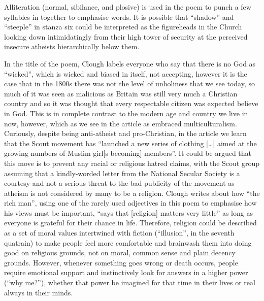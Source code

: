 \documentclass[12pt,a4paper]{article}
\begin{document}
	Alliteration (normal, sibilance, and plosive) is used in the poem to punch a few syllables in together to emphasise words.  It is possible that ``shadow'' and ``steeple'' in stanza six could be interpreted as the figureheads in the Church looking down intimidatingly from their high tower of security at the perceived insecure atheists hierarchically below them.
	
	In the title of the poem, Clough labels everyone who say that there is no God as ``wicked'', which is wicked and biased in itself, not accepting, however it is the case that in the 1800s there was not the level of unholiness that we see today, so much of it was seen as malicious as Britain was still very much a Christian country and so it was thought that every respectable citizen was expected believe in God.  This is in complete contrast to the modern age and country we live in now, however, which as we see in the article as embraced multiculturalism.  Curiously, despite being anti-atheist and pro-Christian, in the article we learn that the Scout movement has ``launched a new series of clothing [\ldots] aimed at the growing numbers of Muslim girl[s becoming] members''.  It could be argued that this move is to prevent any racial or religious hatred claims, with the Scout group assuming that a kindly-worded letter from the National Secular Society is a courtesy and not a serious threat to the bad publicity of the movement as atheism is not considered by many to be a religion.  Clough writes about how ``the rich man'', using one of the rarely used adjectives in this poem to emphasise how his views must be important, ``says that [religion] matters very little'' as long as everyone is grateful for their chance in life.  Therefore, religion could be described as a set of moral values intertwined with fiction (``illusion'', in the seventh quatrain) to make people feel more comfortable and brainwash them into doing good on religious grounds, not on moral, common sense and plain decency grounds.  However, whenever something goes wrong or death occurs, people require emotional support and instinctively look for answers in a higher power (``why me?''), whether that power be imagined for that time in their lives or real always in their minds.
		
\end{document}
